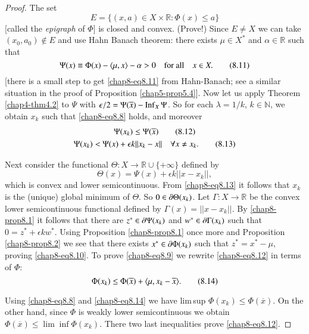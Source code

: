 \begin{proof}
The set
$$
E=\{(x,a)\in X\times \mathbb{R}:\Phi(x)\leq a\}
$$
[called the {\em epigraph} of $\Phi$] is closed and convex. (Prove!)
Since $E\neq X$ we can take $(x_{0},a_{0})\not\in E$ and use Hahn
Banach theorem: there exists $\mu\in X^{*}$ and $\alpha\in \mathbb{R}$
such that
\begin{equation*}
\Psi(x)\equiv \Phi(x)-\langle \mu, x\rangle -\alpha>0\quad\text{for all}\quad x\in
X.\tag{8.11}\label{chap8-eq8.11} 
\end{equation*}
[there is a small step to get \eqref{chap8-eq8.11} from Hahn-Banach;
  see a similar situation in the proof of Proposition
  \ref{chap5-prop5.4}]. Now let us apply Theorem \ref{chap4-thm4.2} to
$\Psi$ with $\epsilon/2=\Psi(\overline{x})-\operatorname{Inf}_{X}\Psi$. So for each
$\lambda=1/k$, $k\in\mathbb{N}$, we obtain $x_{k}$ such that
\eqref{chap8-eq8.8} holds, and moreover
\begin{gather*}
\Psi(x_{k})\leq \Psi(\overline{x})\tag{8.12}\label{chap8-eq8.12}\\
\Psi(x_{k})<\Psi(x)+\epsilon k||x_{k}-x||\quad\forall x\neq
x_{k}.\tag{8.13}\label{chap8-eq8.13} 
\end{gather*}

Next consider the functional $\Theta:X\to \mathbb{R}\cup \{+\infty\}$
defined by
$$
\Theta(x)=\Psi(x)+\epsilon k||x-x_{k}||,
$$
which is convex and lower semicontinuous. From \eqref{chap8-eq8.13} it
follows that $x_{k}$ is the (unique) global minimum of $\Theta$. So
$0\in \partial \Theta(x_{k})$. Let $\Gamma:X\to \mathbb{R}$ be the convex
lower semicontinuous functional defined by $\Gamma(x)=||x-x_{k}||$. By
\ref{chap8-prop8.1} it follows that there are $z^{*}\in \partial
\Psi(x_{k})$ and $w^{*}\in \partial\Gamma(x_{k})$ such that
$0=z^{*}+\epsilon kw^{*}$. Using Proposition \ref{chap8-prop8.1} once
more and Proposition \ref{chap8-prop8.2} we see that there exists
$x^{*}\in \partial \Phi(x_{k})$ such that $z^{*}=x^{*}-\mu$, proving
\eqref{chap8-eq8.10}. To prove \eqref{chap8-eq8.9} we rewrite
\eqref{chap8-eq8.12} in terms of $\Phi$:
\begin{equation*}
\Phi(x_{k})\leq \Phi(\overline{x})+\langle
\mu,x_{k}-\overline{x}\rangle.\tag{8.14}\label{chap8-eq8.14} 
\end{equation*}

Using \eqref{chap8-eq8.8} and \eqref{chap8-eq8.14} we have lim\,sup
$\Phi(x_{k})\leq \Phi(\overline{x})$. On the other hand, since $\Phi$
is weakly lower semicontinuous we obtain $\Phi(\overline{x})\leq
\lim\inf\Phi(x_{k})$. There two last inequalities prove
\eqref{chap8-eq8.12}. 
\end{proof}


